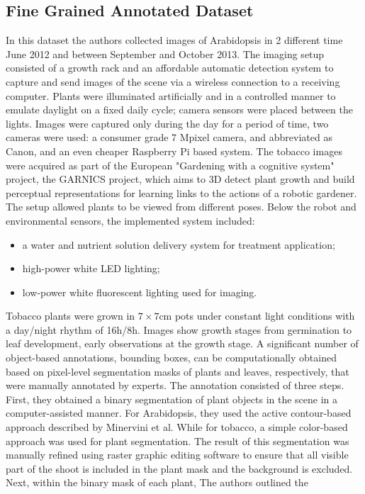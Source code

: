 \subsection{Fine Grained Annotated Dataset}
In this dataset the authors collected images of Arabidopsis in 2 different time June 2012 and between September and October 2013. The imaging setup consisted of a growth rack
and an affordable automatic detection system to capture and send images of the scene via a wireless connection to a receiving computer. Plants were illuminated artificially
and in a controlled manner to emulate daylight on a fixed daily cycle; camera sensors were placed between the lights. Images were captured only during the day for a period
of time, two cameras were used: a consumer grade 7 Mpixel camera, and abbreviated as Canon, and an even cheaper Raspberry Pi based system. The tobacco images were acquired
as part of the European "Gardening with a cognitive system" project, the GARNICS project, which aims to 3D detect plant growth and build perceptual representations for
learning links to the actions of a robotic gardener. The setup allowed plants to be viewed from different poses. Below the robot and environmental sensors, the implemented
system included:
\begin{itemize}
\item a water and nutrient solution delivery system for treatment application;
\item high-power white LED lighting;
\item low-power white fluorescent lighting used for imaging.
\end{itemize}
Tobacco plants were grown in $7\times7$cm pots under constant light conditions with a day/night rhythm of 16h/8h. Images show growth stages from germination to leaf
development, early observations at the growth stage. A significant number of object-based annotations, bounding boxes, can be computationally obtained based on
pixel-level segmentation masks of plants and leaves, respectively, that were manually annotated by experts. The annotation consisted of three steps. First, they obtained
a binary segmentation of plant objects in the scene in a computer-assisted manner. For Arabidopsis, they used the active contour-based approach described by Minervini et al.
While for tobacco, a simple color-based approach was used for plant segmentation. The result of this segmentation was manually refined using raster graphic editing software
to ensure that all visible part of the shoot is included in the plant mask and the background is excluded. Next, within the binary mask of each plant, The authors outlined the

